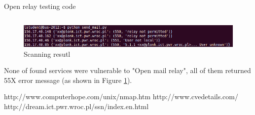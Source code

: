 \documentclass[a4paper, 11pt]{article}
\begin{document}
\begin{listing}[!htb]    
\caption{Open relay testing code}    
\inputminted[mathescape, fontfamily=tt, frame=leftline,framerule=0.4pt,framesep=2mm]{python}{scripts/check_servers.py}
\label{lst:scan_mail}    
\end{listing}

\begin{figure}[!htb]
  \centering
      \includegraphics[width=1\textwidth]{screenshots/send_mail}
  \caption{Scanning resutl}
  \label{fig:mail_scan_result}    
\end{figure}

None of found services were vulnerable to "Open mail relay", all of them returned 55X error message (as shown in Figure \ref{fig:mail_scan_result}).


\begin{thebibliography}{9}

 http://www.computerhope.com/unix/nmap.htm
  http://www.cvedetails.com/
 http://dream.ict.pwr.wroc.pl/ssn/index.en.html

\end{thebibliography}
\end{document}
